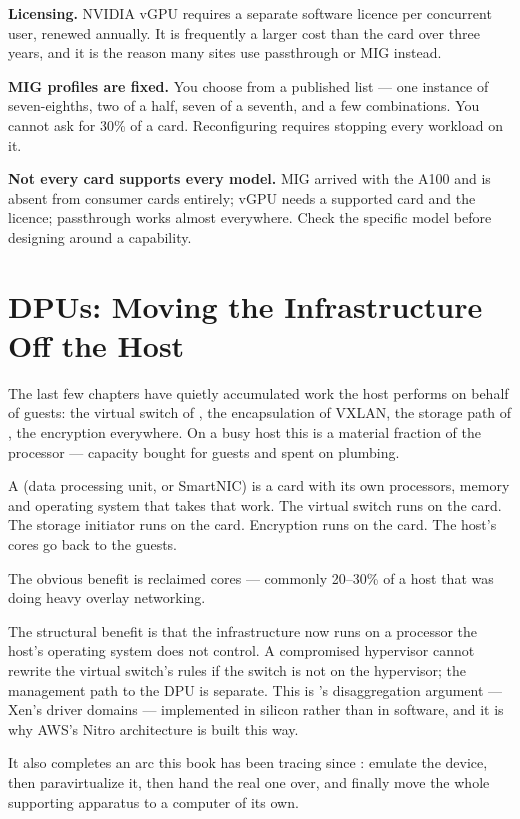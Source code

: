 \begin{alertbox}
\textbf{Licensing.} NVIDIA vGPU requires a separate software licence per
concurrent user, renewed annually. It is frequently a larger cost than the
card over three years, and it is the reason many sites use passthrough or MIG
instead.

\smallskip
\textbf{MIG profiles are fixed.} You choose from a published list --- one
instance of seven-eighths, two of a half, seven of a seventh, and a few
combinations. You cannot ask for 30\% of a card. Reconfiguring requires
stopping every workload on it.

\smallskip
\textbf{Not every card supports every model.} MIG arrived with the A100 and is
absent from consumer cards entirely; vGPU needs a supported card and the
licence; passthrough works almost everywhere. Check the specific model before
designing around a capability.
\end{alertbox}

\section{DPUs: Moving the Infrastructure Off the Host}

The last few chapters have quietly accumulated work the host performs on behalf
of guests: the virtual switch of , the encapsulation of VXLAN,
the storage path of , the encryption everywhere. On a busy host
this is a material fraction of the processor --- capacity bought for guests and
spent on plumbing.

A  (data processing unit, or SmartNIC) is a card with its own
processors, memory and operating system that takes that work. The virtual
switch runs on the card. The storage initiator runs on the card. Encryption
runs on the card. The host's cores go back to the guests.

\begin{conceptbox}
The obvious benefit is reclaimed cores --- commonly 20--30\% of a host that was
doing heavy overlay networking.

\smallskip
The structural benefit is that the infrastructure now runs on a processor the
host's operating system does not control. A compromised hypervisor cannot
rewrite the virtual switch's rules if the switch is not on the hypervisor; the
management path to the DPU is separate. This is 's
disaggregation argument --- Xen's driver domains --- implemented in silicon
rather than in software, and it is why AWS's Nitro architecture is built this
way.

\smallskip
It also completes an arc this book has been tracing since :
emulate the device, then paravirtualize it, then hand the real one over, and
finally move the whole supporting apparatus to a computer of its own.
\end{conceptbox}

